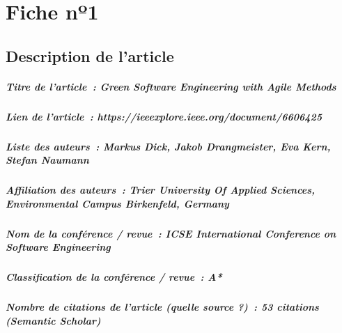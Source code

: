 
\chapter{Fiche nº1} %
\label{app:Fiche1} %

\section{Description de l'article}

\paragraph{Titre de l'article~: \textnormal{Green Software Engineering with Agile Methods}}
\paragraph{Lien de l'article~: \textnormal{https://ieeexplore.ieee.org/document/6606425}}
\paragraph{Liste des auteurs~: \textnormal{Markus Dick, Jakob Drangmeister, Eva Kern, Stefan Naumann}}
\paragraph{Affiliation des auteurs~: \textnormal{Trier University Of Applied Sciences, Environmental Campus Birkenfeld, Germany}}
\paragraph{Nom de la conférence / revue~: \textnormal{ICSE International Conference on Software Engineering}}
\paragraph{Classification de la conférence / revue~: \textnormal{A*}}
\paragraph{Nombre de citations de l'article (quelle source ?)~: \textnormal{53 citations (Semantic Scholar)}}



